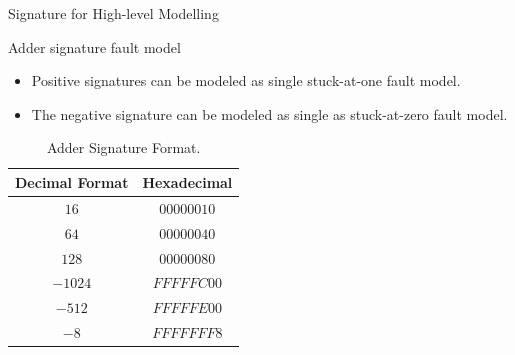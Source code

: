 \documentclass[aspectratio=1610]{beamer}
\begin{document}
\begin{frame}{Signature for High-level Modelling}

\begin{block}{Adder signature fault model}
\end{block}
\begin{itemize}
\item Positive signatures can be modeled as single stuck-at-one fault model.

\item The negative signature can be modeled as single as stuck-at-zero fault model.

\end{itemize}


\begin{table}[tb!]
\center
\caption{Adder Signature Format.}
\label{adder signature format}
\begin{tabular}{|c | c |} 
 \hline
Decimal Format & Hexadecimal   \\ 
\hline
 
 
 $16$& $00000010$    \\
 \hline
 $64$ & $00000040$  \\ 
 \hline
 
 $128$ & $00000080$  \\
 \hline
 $-1024$ & $FFFFFC00$ \\
 \hline
 $-512$ & $FFFFFE00$ \\
 \hline
 $-8$ & $FFFFFFF8$   \\
 \hline
 
 
\end{tabular}
\end{table}





\end{frame}
\end{document}
